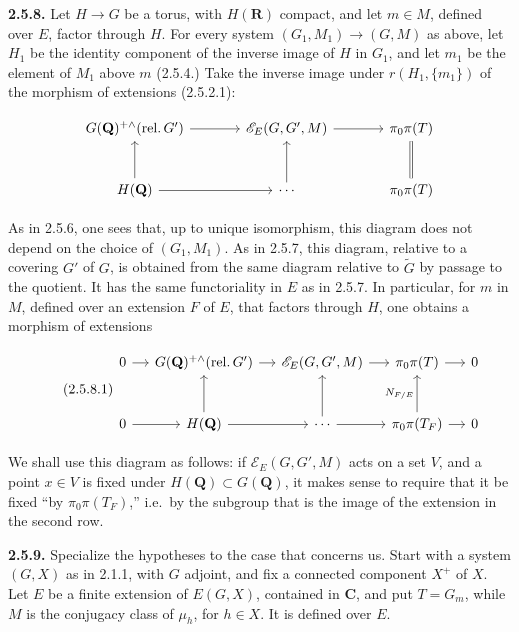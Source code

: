 \documentclass[10pt,a4paper]{article}
\begin{document}
\textbf{2.5.8.} Let \(H\to G\) be a torus, with \(H(\mathbf R)\) compact, and let \(m\in M\), defined over \(E\), factor through \(H\). For every system \((G_1,M_1)\to(G,M)\) as above, let \(H_1\) be the identity component of the inverse image of \(H\) in \(G_1\), and let \(m_1\) be the element of \(M_1\) above \(m\) (2.5.4.) Take the inverse image under \(r(H_1,\{m_1\})\) of the morphism of extensions (2.5.2.1):

\[
\begin{tikzcd}[column sep=large,row sep=large]
G(\mathbf Q)^{+\wedge}(\mathrm{rel.}\,G') \arrow[r] & \mathscr E_E(G,G',M) \arrow[r] & \pi_0\pi(T) \\
H(\mathbf Q) \arrow[r] \arrow[u] & \cdots \arrow[u] & \pi_0\pi(T) \arrow[u,equal]
\end{tikzcd}
\]

As in 2.5.6, one sees that, up to unique isomorphism, this diagram does not depend on the choice of \((G_1,M_1)\). As in 2.5.7, this diagram, relative to a covering \(G'\) of \(G\), is obtained from the same diagram relative to \(\widetilde G\) by passage to the quotient. It has the same functoriality in \(E\) as in 2.5.7. In particular, for \(m\) in \(M\), defined over an extension \(F\) of \(E\), that factors through \(H\), one obtains a morphism of extensions

\[
\tag{2.5.8.1}
\begin{tikzcd}[column sep=small,row sep=large]
0 \arrow[r] & G(\mathbf Q)^{+\wedge}(\mathrm{rel.}\,G') \arrow[r] & \mathscr E_E(G,G',M) \arrow[r] & \pi_0\pi(T) \arrow[r] & 0 \\
0 \arrow[r] & H(\mathbf Q) \arrow[r] \arrow[u] & \cdots \arrow[r] \arrow[u] & \pi_0\pi(T_F) \arrow[r] \arrow[u,"N_{F/E}"] & 0
\end{tikzcd}
\]

We shall use this diagram as follows: if \(\mathscr E_E(G,G',M)\) acts on a set \(V\), and a point \(x\in V\) is fixed under \(H(\mathbf Q)\subset G(\mathbf Q)\), it makes sense to require that it be fixed ``by \(\pi_0\pi(T_F)\),'' i.e.~by the subgroup that is the image of the extension in the second row.

\textbf{2.5.9.} Specialize the hypotheses to the case that concerns us. Start with a system \((G,X)\) as in 2.1.1, with \(G\) adjoint, and fix a connected component \(X^+\) of \(X\). Let \(E\) be a finite extension of \(E(G,X)\), contained in \(\mathbf C\), and put \(T=G_m\), while \(M\) is the conjugacy class of \(\mu_h\), for \(h\in X\). It is defined over \(E\).
\end{document}
